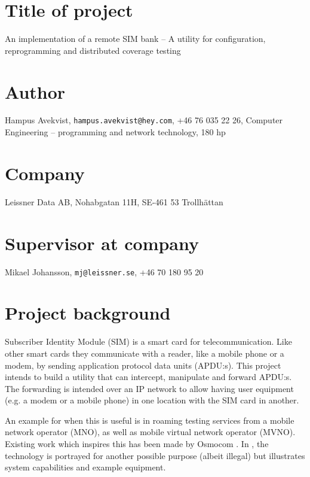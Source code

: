\documentclass[12pt]{article}
\begin{document}
\thispagestyle{fancy}

\section*{Title of project}
An implementation of a remote SIM bank -- A utility for
configuration, reprogramming and distributed coverage testing

\section*{Author}
Hampus Avekvist,\newline
\verb|hampus.avekvist@hey.com|,\newline
+46 76 035 22 26,\newline
Computer Engineering -- programming and network technology, 180 hp

\section*{Company}
Leissner Data AB,\newline
Nohabgatan 11H, SE-461 53 Trollhättan

\section*{Supervisor at company}
Mikael Johansson,\newline
\verb|mj@leissner.se|,\newline
+46 70 180 95 20

\section*{Project background}

Subscriber Identity Module (SIM) is a smart card for telecommunication.
Like other smart cards they communicate with a reader, like a mobile
phone or a modem, by sending application protocol data units (APDU:s).
This project intends to build a utility that can intercept, manipulate
and forward APDU:s. The forwarding is intended over an IP network to
allow having user equipment (e.g. a modem or a mobile phone) in one
location with the SIM card in another.

An example for when this is useful is in roaming testing services
from a mobile network operator (MNO), as well as mobile virtual
network operator (MVNO). Existing work which inspires this has been
made by Osmocom \cite{osmo-remsim}. In \cite{simbox}, the technology
is portrayed for another possible purpose (albeit illegal) but
illustrates system capabilities and example equipment.
\end{document}
